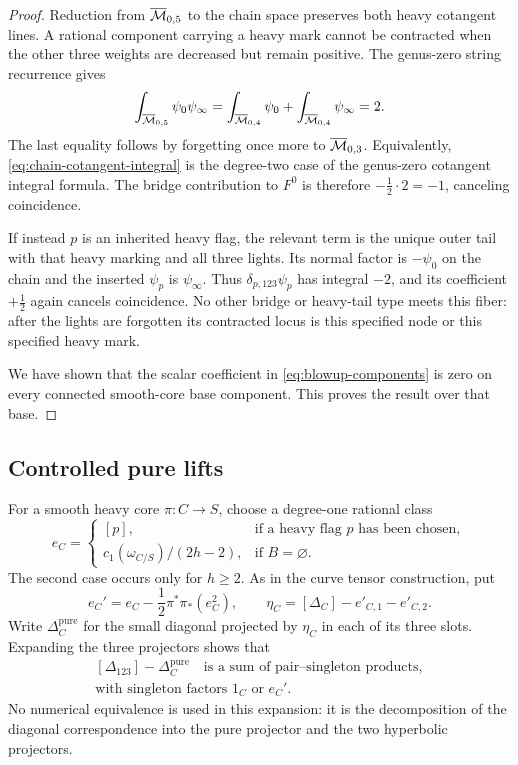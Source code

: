 \begin{proof}
Reduction from $\overline{\mathcal M}_{0,5}$ to the chain space preserves both heavy
cotangent lines.  A rational component carrying a heavy mark cannot
be contracted when the other three weights are decreased but remain
positive.  The genus-zero string recurrence gives
\begin{equation}\label{eq:chain-cotangent-integral}
 \int_{\overline{\mathcal M}_{0,5}}\psi_0\psi_\infty
   =\int_{\overline{\mathcal M}_{0,4}}\psi_0
     +\int_{\overline{\mathcal M}_{0,4}}\psi_\infty
   =2.
\end{equation}
The last equality follows by forgetting once more to
$\overline{\mathcal M}_{0,3}$.  Equivalently,
\eqref{eq:chain-cotangent-integral} is the degree-two case of the
genus-zero cotangent integral formula.  The bridge contribution to
$F^0$ is therefore $-\tfrac12\cdot2=-1$, canceling coincidence.

If instead $p$ is an inherited heavy flag, the relevant term is the
unique outer tail with that heavy marking and all three lights.
Its normal factor is $-\psi_0$ on the chain and the inserted
$\psi_p$ is $\psi_\infty$.  Thus
$\delta_{p,123}\psi_p$ has integral $-2$, and its coefficient
$+\tfrac12$ again cancels coincidence.  No other bridge or heavy-tail
type meets this fiber: after the lights are forgotten its contracted
locus is this specified node or this specified heavy mark.

We have shown that the scalar coefficient in
\eqref{eq:blowup-components} is zero on every connected smooth-core
base component.  This proves the result over that base.
\end{proof}

\subsection{Controlled pure lifts}

For a smooth heavy core $\pi:C\to S$, choose a degree-one rational
class
\[
 e_C=
 \begin{cases}
 [p],&\text{if a heavy flag $p$ has been chosen},\\
 c_1(\omega_{C/S})/(2h-2),&\text{if $B=\varnothing$}.
 \end{cases}
\]
The second case occurs only for $h\geq2$.  As in the curve tensor
construction, put
\begin{equation}\label{eq:compact-centering}
 e_C'=e_C-\frac12\pi^*\pi_*(e_C^2),
 \qquad
 \eta_C=[\Delta_C]-e'_{C,1}-e'_{C,2}.
\end{equation}
Write $\Delta_C^{\mathrm{pure}}$ for the small diagonal projected by
$\eta_C$ in each of its three slots.  Expanding the three projectors
shows that
\begin{equation}\label{eq:nonpure-pair-singleton}
 \begin{gathered}
 [\Delta_{123}]-\Delta_C^{\mathrm{pure}}
 \quad\text{is a sum of pair--singleton products},\\
 \text{with singleton factors }1_C\text{ or }e_C'.
 \end{gathered}
\end{equation}
No numerical equivalence is used in this expansion: it is the
decomposition of the diagonal correspondence into the pure projector
and the two hyperbolic projectors.


